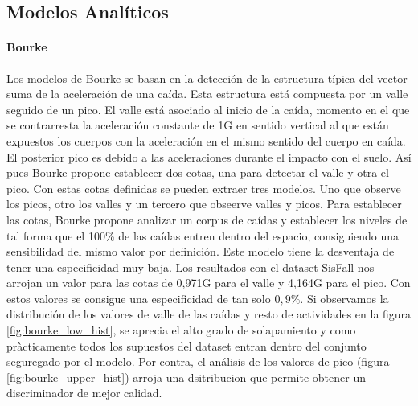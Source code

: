 \documentclass[../tfm.tex]{subfiles}
\begin{document}
\subsection{Modelos Analíticos}
\paragraph{Bourke}

Los modelos de Bourke \cite{Bourke2006} se basan en la detección de la estructura típica del vector suma de la aceleración de una caída. Esta estructura está compuesta por un valle seguido de un pico. El valle está asociado al inicio de la caída, momento en el que se contrarresta la aceleración constante de 1G en sentido vertical al que están expuestos los cuerpos con la aceleración en el mismo sentido del cuerpo en caída. El posterior pico es debido a las aceleraciones durante el impacto con el suelo. Así pues Bourke propone establecer dos cotas, una para detectar el valle y otra el pico. Con estas cotas definidas se pueden extraer tres modelos. Uno que observe los picos, otro los valles y un tercero que obseerve valles y picos.
Para establecer las cotas, Bourke propone analizar un corpus de caídas y establecer los niveles de tal forma que el 100\% de las caídas entren dentro del espacio, consiguiendo una sensibilidad del mismo valor por definición. Este modelo tiene la desventaja de tener una especificidad muy baja. Los resultados con el dataset SisFall nos arrojan un valor para las cotas de 0,971G para el valle y 4,164G para el pico. Con estos valores se consigue una especificidad de tan solo $0,9\%$. Si observamos la distribución de los valores de valle de las caídas y resto de actividades en la figura \ref{fig:bourke_low_hist}, se aprecia el alto grado de solapamiento y como pràcticamente todos los supuestos del dataset entran dentro del conjunto seguregado por el modelo. Por contra, el análisis de los valores de pico (figura \ref{fig:bourke_upper_hist}) arroja una dsitribucion que permite obtener un discriminador de mejor calidad.
\end{document}

